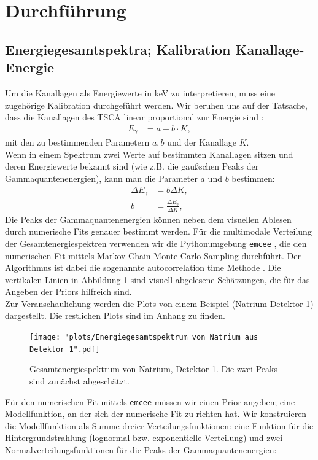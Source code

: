 \documentclass[%
aps,
onecolumn,
11pt,
tightenlines,
nofootinbib,
superscriptaddress,
floatfix,
prd,
]{revtex4-2}
\begin{document}
\section{Durchführung}
\label{sec:Durchführung und Resultate}
\subsection{Energiegesamtspektra; Kalibration Kanallage-Energie}
Um die Kanallagen als Energiewerte in keV zu interpretieren, muss eine zugehörige Kalibration durchgeführt werden. Wir beruhen uns auf der Tatsache, dass die Kanallagen des TSCA linear proportional zur Energie sind \cite{manualold}:
\begin{align}
	E_{\gamma} &= a + b\cdot K,
	\label{eq:calibrate}
\end{align}
mit den zu bestimmenden Parametern $a,b$ und der Kanallage $K$. \\
Wenn in einem Spektrum zwei Werte auf bestimmten Kanallagen sitzen und deren Energiewerte bekannt sind (wie z.B. die gaußschen Peaks der Gammaquantenenergien), kann man die Parameter $a$ und $b$ bestimmen:
\begin{align}
	\Delta E_{\gamma} &= b \Delta K , \\
	b &= \frac{\Delta E_{\gamma}}{\Delta K},
\end{align}
Die Peaks der Gammaquantenenergien können neben dem visuellen Ablesen durch numerische Fits genauer bestimmt werden. Für die multimodale Verteilung der Gesamtenergiespektren verwenden wir die Pythonumgebung \texttt{emcee} \cite{Foreman_Mackey_2013}, die den numerischen Fit mittels Markov-Chain-Monte-Carlo Sampling durchführt. Der Algorithmus ist dabei die sogenannte autocorrelation time Methode \cite{Foreman_Mackey_2013}. Die vertikalen Linien in Abbildung \ref{fig:so1initial} sind visuell abgelesene Schätzungen, die für das Angeben der Priors hilfreich sind.\\
Zur Veranschaulichung werden die Plots von einem Beispiel (Natrium Detektor 1) dargestellt. Die restlichen Plots sind im Anhang zu finden.
\begin{figure}[H]
		\centering
		\texttt{[image: "plots/Energiegesamtspektrum von Natrium aus Detektor 1".pdf]}
		\caption{Gesamtenergiespektrum von Natrium, Detektor 1.
		Die zwei Peaks sind zunächst abgeschätzt.}
		\label{fig:so1initial}
\end{figure}
Für den numerischen Fit mittels \texttt{emcee} müssen wir einen Prior angeben; eine Modellfunktion, an der sich der numerische Fit zu richten hat. Wir konstruieren die Modellfunktion als Summe dreier Verteilungsfunktionen: eine Funktion für die Hintergrundstrahlung (lognormal bzw. exponentielle Verteilung) und zwei Normalverteilungsfunktionen für die Peaks der Gammaquantenenergien:
\end{document}
